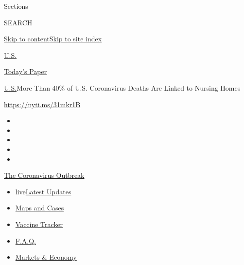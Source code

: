 Sections

SEARCH

\protect\hyperlink{site-content}{Skip to
content}\protect\hyperlink{site-index}{Skip to site index}

\href{https://www.nytimes.com/section/us}{U.S.}

\href{https://myaccount.nytimes.com/auth/login?response_type=cookie\&client_id=vi}{}

\href{https://www.nytimes.com/section/todayspaper}{Today's Paper}

\href{/section/us}{U.S.}\textbar{}More Than 40\% of U.S. Coronavirus
Deaths Are Linked to Nursing Homes

\href{https://nyti.ms/31mkr1B}{https://nyti.ms/31mkr1B}

\begin{itemize}
\item
\item
\item
\item
\item
\end{itemize}

\href{https://www.nytimes.com/news-event/coronavirus?action=click\&pgtype=Article\&state=default\&region=TOP_BANNER\&context=storylines_menu}{The
Coronavirus Outbreak}

\begin{itemize}
\tightlist
\item
  live\href{https://www.nytimes.com/2020/08/08/world/coronavirus-updates.html?action=click\&pgtype=Article\&state=default\&region=TOP_BANNER\&context=storylines_menu}{Latest
  Updates}
\item
  \href{https://www.nytimes.com/interactive/2020/us/coronavirus-us-cases.html?action=click\&pgtype=Article\&state=default\&region=TOP_BANNER\&context=storylines_menu}{Maps
  and Cases}
\item
  \href{https://www.nytimes.com/interactive/2020/science/coronavirus-vaccine-tracker.html?action=click\&pgtype=Article\&state=default\&region=TOP_BANNER\&context=storylines_menu}{Vaccine
  Tracker}
\item
  \href{https://www.nytimes.com/interactive/2020/world/coronavirus-tips-advice.html?action=click\&pgtype=Article\&state=default\&region=TOP_BANNER\&context=storylines_menu}{F.A.Q.}
\item
  \href{https://www.nytimes.com/live/2020/08/07/business/stock-market-today-coronavirus?action=click\&pgtype=Article\&state=default\&region=TOP_BANNER\&context=storylines_menu}{Markets
  \& Economy}
\end{itemize}

